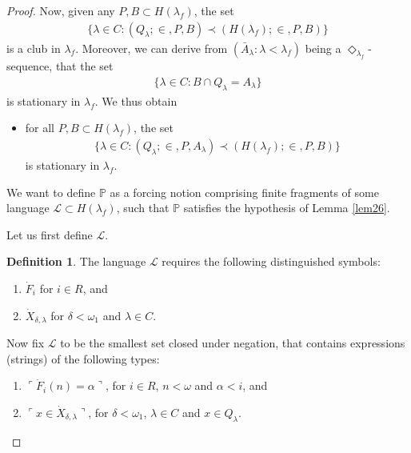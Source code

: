 \documentclass[12pt, twoside]{memoir}
\numberwithin{equation}{section}
\theoremstyle{definition}
\newtheorem{defi}[thm]{Definition}
\theoremstyle{remark}
\theoremstyle{definition}
\theoremstyle{definition}
\theoremstyle{definition}
\theoremstyle{remark}
\begin{document}
\begin{proof}
Now, given any $P, B \subset H(\lambda_f)$, the set
\begin{align*}
    \{\lambda \in C : (Q_{\lambda}; \in, P, B) \prec (H(\lambda_f); \in, P, B)\}
\end{align*}
is a club in $\lambda_f$. Moreover, we can derive from $(\bar{A}_{\lambda} : \lambda < \lambda_f)$ being a $\Diamond_{\lambda_f}$-sequence, that the set
\begin{align*}
    \{\lambda \in C : B \cap Q_{\lambda} = A_{\lambda}\}
\end{align*}
is stationary in $\lambda_f$. We thus obtain
\begin{itemize}[label=($\diamond$)]
    \item for all $P, B \subset H(\lambda_f)$, the set
    \begin{align*}
        \{\lambda \in C : (Q_{\lambda}; \in, P, A_{\lambda}) \prec (H(\lambda_f); \in, P, B)\}
    \end{align*}
    is stationary in $\lambda_f$.
\end{itemize}

We want to define $\mathbb{P}$ as a forcing notion comprising finite fragments of some language $\mathcal{L} \subset H(\lambda_f)$, such that $\mathbb{P}$ satisfies the hypothesis of Lemma \ref{lem26}.

Let us first define $\mathcal{L}$.

\begin{defi}\label{defl}
The language $\mathcal{L}$ requires the following distinguished symbols:
\begin{enumerate}[label=(\alph*)]
    \item $\dot{F}_i$ for $i \in R$, and
    \item $\dot{X}_{\delta, \lambda}$ for $\delta < \omega_1$ and $\lambda \in C$.
\end{enumerate}

Now fix $\mathcal{L}$ to be the smallest set closed under negation, that contains expressions (strings) of the following types:
\begin{enumerate}[label=(L\arabic*), leftmargin=40pt]
    \item $\ulcorner \dot{F}_i (n) = \alpha \urcorner$, for $i \in R$, $n < \omega$ and $\alpha < i$, and
    \item $\ulcorner x \in \dot{X}_{\delta, \lambda} \urcorner$, for $\delta < \omega_1$, $\lambda \in C$ and $x \in Q_{\lambda}$.
\end{enumerate}
\end{defi}


\end{proof}
\end{document}
